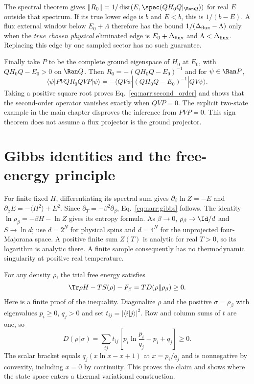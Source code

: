 The spectral theorem gives
$\|R_0\|=1/\operatorname{dist}(E,\spec(QH_0Q|_{\Ran Q}))$ for real $E$
outside that spectrum. If its true lower edge is $b$ and $E<b$, this is
$1/(b-E)$. A flux external window below $E_0+\Lambda$ therefore has the bound
$1/(\Delta_{\rm flux}-\Lambda)$ only when the \emph{true chosen physical}
eliminated edge is $E_0+\Delta_{\rm flux}$ and $\Lambda<\Delta_{\rm flux}$.
Replacing this edge by one sampled sector has no such guarantee.

Finally take $P$ to be the complete ground eigenspace of $H_0$ at $E_0$,
with $QH_0Q-E_0>0$ on $\Ran Q$. Then
$R_0=-(QH_0Q-E_0)^{-1}$ and for $\psi\in\Ran P$,
\begin{equation}
 \langle\psi|PVQ R_0 QVP|\psi\rangle
 =-\langle QV\psi|(QH_0Q-E_0)^{-1}|QV\psi\rangle.
\end{equation}
Taking a positive square root proves Eq.~\eqref{eq:narr:second_order} and shows
that the second-order operator vanishes exactly when $QVP=0$. The explicit
two-state example in the main chapter disproves the inference from $PVP=0$.
This sign theorem does not assume a flux projector is the ground projector.

\section{Gibbs identities and the free-energy principle}
\label{app:gibbs_proof}
For finite fixed $H$, differentiating its spectral sum gives
$\partial_\beta\ln Z=-E$ and
$\partial_\beta E=-\langle H^2\rangle+E^2$. Since
$\partial_T=-\beta^2\partial_\beta$, Eq.~\eqref{eq:narr:gibbs} follows.
The identity $\ln\rho_\beta=-\beta H-\ln Z$ gives its entropy formula.
As $\beta\to0$, $\rho_\beta\to\Id/d$ and $S\to\ln d$; use $d=2^N$ for
physical spins and $d=4^N$ for the unprojected four-Majorana space.
A positive finite sum $Z(T)$ is analytic for real $T>0$, so its logarithm is
analytic there. A finite sample consequently has no thermodynamic singularity
at positive real temperature.

For any density $\rho$, the trial free energy satisfies
\begin{equation}
 \Tr\rho H-T S(\rho)-F_\beta
    =T D(\rho\Vert\rho_\beta)\geq0.
\end{equation}
Here is a finite proof of the inequality. Diagonalize $\rho$ and the positive
$\sigma=\rho_\beta$ with eigenvalues $p_i\geq0$, $q_j>0$ and set
$t_{ij}=|\langle i|j\rangle|^2$. Row and column sums of $t$ are one, so
\begin{equation}
 D(\rho\Vert\sigma)=\sum_{ij}t_{ij}
    \left[p_i\ln\frac{p_i}{q_j}-p_i+q_j\right]\geq0.
\end{equation}
The scalar bracket equals $q_j(x\ln x-x+1)$ at $x=p_i/q_j$ and is nonnegative
by convexity, including $x=0$ by continuity. This proves the claim and shows
where the state space enters a thermal variational construction.

